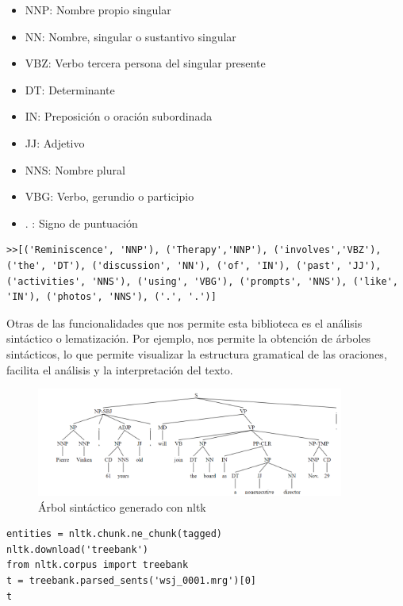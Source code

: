 \begin{itemize}
	\item NNP: Nombre propio singular
	\item NN: Nombre, singular o sustantivo singular
	\item VBZ: Verbo tercera persona del singular presente
	\item DT: Determinante
	\item IN: Preposición o oración subordinada
	\item JJ: Adjetivo
	\item NNS: Nombre plural 
	\item VBG: Verbo, gerundio o participio
	\item . : Signo de puntuación
\end{itemize}

\begin{lstlisting}[style=SpyderStyle, caption={Tokenización y etiquetado con nltk}, captionpos=b, label={lst:python},breaklines = true]
>>[('Reminiscence', 'NNP'), ('Therapy','NNP'), ('involves','VBZ'), ('the', 'DT'), ('discussion', 'NN'), ('of', 'IN'), ('past', 'JJ'), ('activities', 'NNS'), ('using', 'VBG'), ('prompts', 'NNS'), ('like', 'IN'), ('photos', 'NNS'), ('.', '.')]

\end{lstlisting}

Otras de las funcionalidades que nos permite esta biblioteca es el análisis sintáctico o lematización. Por ejemplo, nos permite la obtención de árboles sintácticos, lo que permite visualizar la estructura gramatical de las oraciones, facilita el análisis y la interpretación del texto. \\

\begin{figure}[h]
	\centering
	\includegraphics[width=0.9\textwidth]{Imagenes/arbolsintactico}
	\caption{Árbol sintáctico generado con nltk}
	\label{fig:1}
\end{figure}

\begin{lstlisting}[style=SpyderStyle, caption={Análisis sintáctico y lematización con nltk}, captionpos=b, label={lst:python},breaklines = true]
entities = nltk.chunk.ne_chunk(tagged)
nltk.download('treebank')
from nltk.corpus import treebank
t = treebank.parsed_sents('wsj_0001.mrg')[0]
t
\end{lstlisting}


